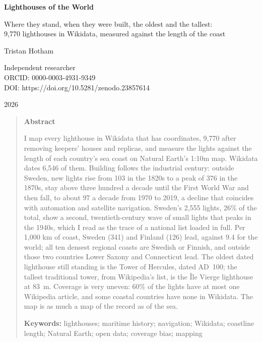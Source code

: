 \documentclass[11pt,a4paper]{article}
\begin{document}
\begin{center}
{\Large\bfseries Lighthouses of the World\par}
\vspace{0.4em}
{\large Where they stand, when they were built, the oldest and the tallest:\\9,770 lighthouses in Wikidata, measured against the length of the coast\par}
\vspace{1.2em}
{\large Tristan Hotham\par}
\vspace{0.3em}
{\small Independent researcher\\
ORCID: 0000-0003-4931-9349\\
DOI: https://doi.org/10.5281/zenodo.23857614\par}
\vspace{0.8em}
2026
\end{center}

\begin{quote}
\small
\begin{center}\textbf{Abstract}\end{center}
I map every lighthouse in Wikidata that has coordinates, 9,770 after removing keepers' houses and replicas, and measure the lights against the length of each country's sea coast on Natural Earth's 1:10m map. Wikidata dates 6,546 of them. Building follows the industrial century: outside Sweden, new lights rise from 103 in the 1820s to a peak of 376 in the 1870s, stay above three hundred a decade until the First World War and then fall, to about 97 a decade from 1970 to 2019, a decline that coincides with automation and satellite navigation. Sweden's 2,555 lights, 26\% of the total, show a second, twentieth-century wave of small lights that peaks in the 1940s, which I read as the trace of a national list loaded in full. Per 1,000 km of coast, Sweden (341) and Finland (126) lead, against 9.4 for the world; all ten densest regional coasts are Swedish or Finnish, and outside those two countries Lower Saxony and Connecticut lead. The oldest dated lighthouse still standing is the Tower of Hercules, dated AD~100; the tallest traditional tower, from Wikipedia's list, is the Île Vierge lighthouse at 83~m. Coverage is very uneven: 60\% of the lights have at most one Wikipedia article, and some coastal countries have none in Wikidata. The map is as much a map of the record as of the sea.

\textbf{Keywords:} lighthouses; maritime history; navigation; Wikidata; coastline length; Natural Earth; open data; coverage bias; mapping
\end{quote}
\end{document}
